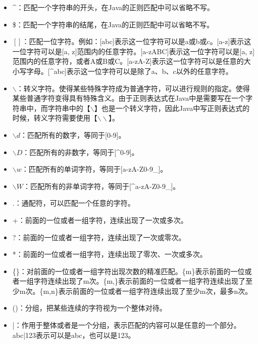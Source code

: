 \begin{itemize}
	\item \^{}：匹配一个字符串的开头，在Java的正则匹配中可以省略不写。

	\item \$：匹配一个字符串的结尾，在Java的正则匹配中可以省略不写。

	\item $ [] $：匹配一位字符。例如：[abc]表示这一位字符可以是a或b或c。[a-z]表示这一位字符可以是[a, z]范围内的任意字符。[a-zABC]表示这一位字符可以是[a, z]范围内的任意字符，或者A或B或C。[a-zA-Z]表示这一位字符可以是任意的大小写字母。[\^{}abc]表示这一位字符可以是除了a、b、c以外的任意字符。

	\item $ \backslash $：转义字符。使得某些特殊字符成为普通字符，可以进行规则的指定。使得某些普通字符变得具有特殊含义。由于正则表达式在Java中是需要写在一个字符串中，而字符串中的【$ \backslash $】也是一个转义字符，因此Java中写正则表达式的时候，转义字符需要使用【$ \backslash\backslash $】。

	\item $ \backslash d $：匹配所有的数字，等同于[0-9]。

	\item $ \backslash D $：匹配所有的非数字，等同于[\^{}0-9]。

	\item $ \backslash w $：匹配所有的单词字符，等同于[a-zA-Z0-9\_]。

	\item $ \backslash W $：匹配所有的非单词字符，等同于[\^{}a-zA-Z0-9\_]。

	\item .：通配符，可以匹配一个任意的字符。

	\item +：前面的一位或者一组字符，连续出现了一次或多次。

	\item ?：前面的一位或者一组字符，连续出现了一次或零次。

	\item *：前面的一位或者一组字符，连续出现了零次、一次或多次。

	\item \{\}：对前面的一位或者一组字符出现次数的精准匹配。\{m\}表示前面的一位或者一组字符连续出现了m次。\{m,\}表示前面的一位或者一组字符连续出现了至少m次。\{m,n\}表示前面的一位或者一组字符连续出现了至少m次，最多n次。

	\item ()：分组，把某些连续的字符视为一个整体对待。

	\item |：作用于整体或者是一个分组，表示匹配的内容可以是任意的一个部分。abc|123表示可以是abc，也可以是123。
\end{itemize}

